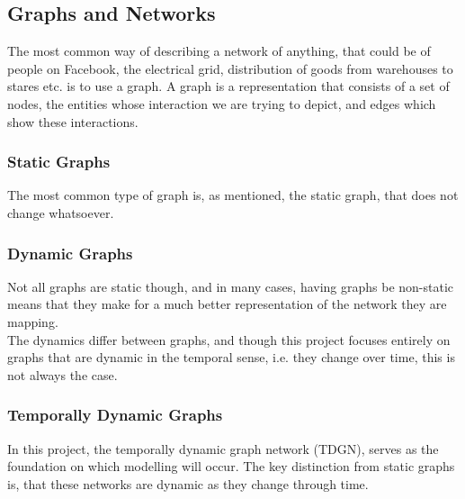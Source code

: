 \subsection{Graphs and Networks}
\label{sec:Method:Graphs}
The most common way of describing a network of anything, that could be of people on Facebook, the electrical grid, distribution of goods from warehouses to stares etc. is to use a graph.
A graph is a representation that consists of a set of nodes, the entities whose interaction we are trying to depict, and edges which show these interactions.





\subsubsection{Static Graphs}
\label{sec:Method:Graphs:StaticGraphs}
The most common type of graph is, as mentioned, the static graph, that does not change whatsoever.


\subsubsection{Dynamic Graphs}
\label{sec:Method:Graphs:DynamicGraphs}
Not all graphs are static though, and in many cases, having graphs be non-static means that they make for a much better representation of the network they are mapping.
\\
The dynamics differ between graphs, and though this project focuses entirely on graphs that are dynamic in the temporal sense, i.e. they change over time, this is not always the case.



\subsubsection{Temporally Dynamic Graphs}
\label{sec:Method:Graphs:TemporallyDynamicGraphs}
In this project, the temporally dynamic graph network (TDGN), serves as the foundation on which modelling will occur.
The key distinction from static graphs is, that these networks are dynamic as they change through time.










